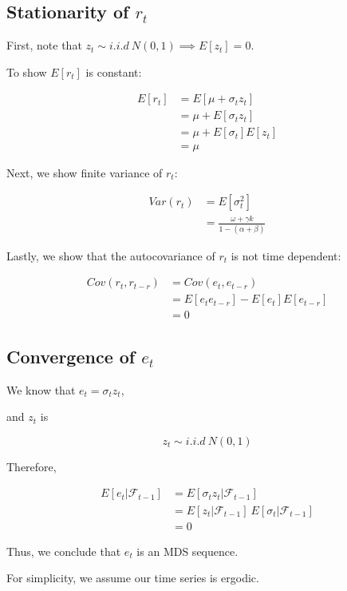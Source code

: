 \documentclass{article}
\begin{document}
\subsection{Stationarity of $r_t$}

First, note that $z_t \sim i.i.d \ N(0,1) \implies E[z_t] = 0$.

To show $E[r_t]$ is constant:

\[
\begin{split}
E[r_t] &= E[\mu + \sigma_t z_t] \\
        &= \mu + E[\sigma_t z_t] \\
        &= \mu + E[\sigma_t]E[z_t] \\
        &= \mu
\end{split}
\]

Next, we show finite variance of $r_t$:

\[
\begin{split}
Var(r_t) &= E[\sigma_t^2] \\ 
        &= \frac{\omega + \gamma k}{1-(\alpha+\beta)}
\end{split}
\]

Lastly, we show that the autocovariance of $r_t$ is not time dependent:

\[
\begin{split}
Cov(r_t, r_{t-r}) &= Cov(e_t, e_{t-r}) \\ 
        &= E[e_t e_{t-r}] -E[e_t] E[e_{t-r}] \\ 
        &= 0
\end{split}
\]

\subsection{Convergence of $e_t$}

We know that $e_t = \sigma_t z_t$,

and $z_t$ is

\[
z_t  \sim i.i.d \ N(0, 1)
\]

Therefore,

\[
\begin{split}
    E[e_{t}| \mathcal{F}_{t-1}] &= E[\sigma_t z_t| \mathcal{F}_{t-1}] \\
    &= E[z_{t}| \mathcal{F}_{t-1}] \ E[\sigma_t| \mathcal{F}_{t-1}] \\
    &= 0
\end{split}
\]

Thus, we conclude that $e_t$ is an MDS sequence.

For simplicity, we assume our time series is ergodic.
\end{document}
